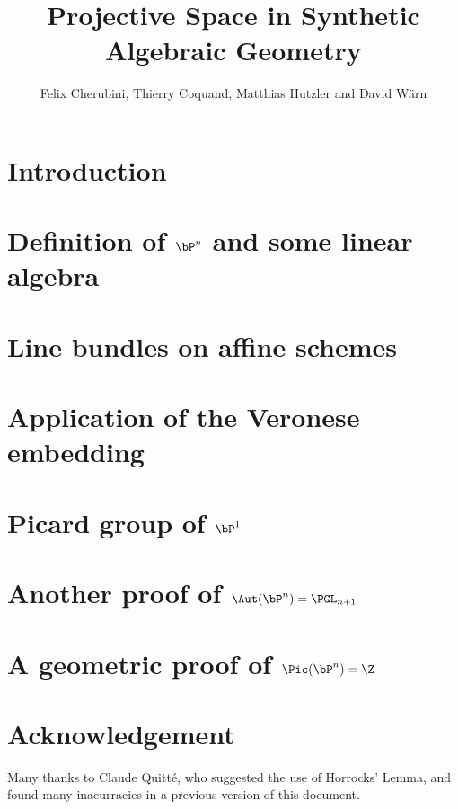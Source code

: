 \documentclass{../util/zariski-small}
\title{Projective Space in Synthetic Algebraic Geometry}
\begin{document}
\author{Felix Cherubini, Thierry Coquand, Matthias Hutzler and David Wärn}

\maketitle

\section*{Introduction}


\section[Definition of projective space and some linear algebra]{Definition of $\bP^n$ and some linear algebra}


%

\section{Line bundles on affine schemes}


\section{Application of the Veronese embedding}


\section[Picard group of projective space]{Picard group of $\bP^1$}


\section[Automorphism group of projective space]{Another proof of $\Aut(\bP^n) = \PGL_{n+1}$}


\section[Picard group of projective space (geometric)]{A geometric proof of $\Pic(\bP^n)=\Z$}
\label{geometric-proof}


\section*{Acknowledgement}

Many thanks to Claude Quitt\'e, who suggested the use of Horrocks' Lemma, and found many
inacurracies in a previous version of this document.


\newpage



\printindex

\printbibliography
\end{document}
